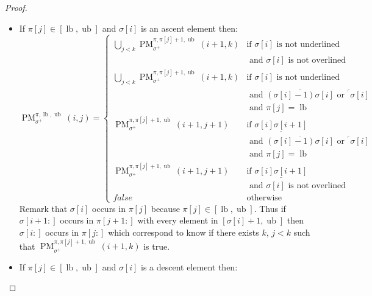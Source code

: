 \documentclass[a4paper]{llncs}
\newcommand{\ptext}{\pi}
\newcommand{\pmotif}{\sigma}
\newcommand{\pbmotif}{\pmotif^+}
\DeclareMathOperator{\PMa}{PM}
\newcommand{\PM}[6]{\PMa_{{#1}}^{{#2},{#3},{#4}}({#5},{#6})}
\DeclareMathOperator{\lb}{lb}
\DeclareMathOperator{\ub}{ub}
\begin{document}
\begin{proof}
\begin{itemize}
	\item If $\ptext[j] \in [\lb,\ub]$ and $\pmotif[i]$ is an ascent element then:
	$$
	\PM{\pbmotif}{\ptext}{\lb}{\ub}{i}{j}=
	\begin{cases}
		\bigcup_{j<k} \PM{\pbmotif}{\ptext}{\ptext[j]+1}{\ub}{i+1}{k}
			& \text{if $\pmotif[i]$ is not underlined } \\
			& \text{ and $\pmotif[i]$ is not overlined} \\
		\bigcup_{j<k} \PM{\pbmotif}{\ptext}{\ptext[j]+1}{\ub}{i+1}{k}
			& \text{if $\pmotif[i]$ is not underlined } \\
			& \text{ and $\overline{(\pmotif[i]-1)\pmotif[i]}$ or $^\ulcorner{\pmotif[i]}$}\\
			& \text{ and $\ptext[j]=\lb$} \\
		\PM{\pbmotif}{\ptext}{\ptext[j]+1}{\ub}{i+1}{j+1}
			& \text{if $\underline{\pmotif[i]\pmotif[i+1]}$ } \\
			& \text{ and $\overline{(\pmotif[i]-1)\pmotif[i]}$ or $^\ulcorner{\pmotif[i]}$}\\
			& \text{ and $\ptext[j]=\lb$} \\
		\PM{\pbmotif}{\ptext}{\ptext[j]+1}{\ub}{i+1}{j+1}
			& \text{if $\underline{\pmotif[i]\pmotif[i+1]}$ } \\
			& \text{ and $\pmotif[i]$ is not overlined} \\
		false & \text{otherwise}

	\end{cases}
	$$	
	Remark that $\pmotif[i]$ occurs in $\ptext[j]$ because $\ptext[j] \in [\lb,\ub]$.
	Thus if $\pmotif[i+1:]$ occurs in $\ptext[j+1:]$ with every element in $[\pmotif[i]+1,\ub]$ then 
 	$\pmotif[i:]$ occurs in $\ptext[j:]$  	
 	which correspond to know if there exists $k$, $j<k$ such that
	$\PM{\pbmotif}{\ptext}{\ptext[j]+1}{\ub}{i+1}{k}$ is true.

	
	\item If $\ptext[j] \in [\lb,\ub]$ and $\pmotif[i]$ is a descent element then:


\end{itemize}
\end{proof}
\end{document}
